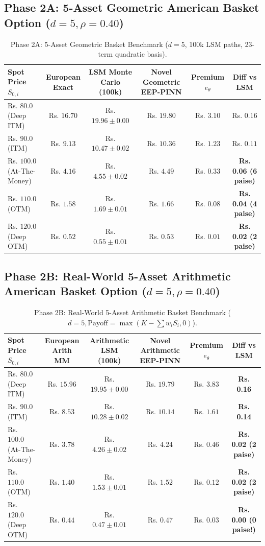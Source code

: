 \documentclass[11pt,a4paper]{article}
\begin{document}
\subsection{Phase 2A: 5-Asset Geometric American Basket Option ($d=5, \rho=0.40$)}
\begin{table}[htbp]
\centering
\small
\caption{Phase 2A: 5-Asset Geometric Basket Benchmark ($d=5$, 100k LSM paths, 23-term quadratic basis).}
\begin{tabularx}{\textwidth}{@{}l c c c c c@{}}
\toprule
\textbf{Spot Price $S_{0,i}$} & \textbf{European Exact} & \textbf{LSM Monte Carlo (100k)} & \textbf{Novel Geometric EEP-PINN} & \textbf{Premium $e_\theta$} & \textbf{Diff vs LSM} \\ \midrule
Rs. $80.0$ (Deep ITM) & Rs. $16.70$ & Rs. $19.96 \pm 0.00$ & Rs. $19.80$ & Rs. $3.10$ & Rs. $0.16$ \\
Rs. $90.0$ (ITM) & Rs. $9.13$ & Rs. $10.47 \pm 0.02$ & Rs. $10.36$ & Rs. $1.23$ & Rs. $0.11$ \\
Rs. $100.0$ (At-The-Money) & Rs. $4.16$ & Rs. $4.55 \pm 0.02$ & Rs. $4.49$ & Rs. $0.33$ & \textbf{Rs. 0.06 (6 paise)} \\
Rs. $110.0$ (OTM) & Rs. $1.58$ & Rs. $1.69 \pm 0.01$ & Rs. $1.66$ & Rs. $0.08$ & \textbf{Rs. 0.04 (4 paise)} \\
Rs. $120.0$ (Deep OTM) & Rs. $0.52$ & Rs. $0.55 \pm 0.01$ & Rs. $0.53$ & Rs. $0.01$ & \textbf{Rs. 0.02 (2 paise)} \\ \bottomrule
\end{tabularx}
\end{table}

\subsection{Phase 2B: Real-World 5-Asset Arithmetic American Basket Option ($d=5, \rho=0.40$)}
\begin{table}[htbp]
\centering
\small
\caption{Phase 2B: Real-World 5-Asset Arithmetic Basket Benchmark ($d=5, \text{Payoff} = \max(K - \sum w_i S_i, 0)$).}
\begin{tabularx}{\textwidth}{@{}l c c c c c@{}}
\toprule
\textbf{Spot Price $S_{0,i}$} & \textbf{European Arith MM} & \textbf{Arithmetic LSM (100k)} & \textbf{Novel Arithmetic EEP-PINN} & \textbf{Premium $e_\theta$} & \textbf{Diff vs LSM} \\ \midrule
Rs. $80.0$ (Deep ITM) & Rs. $15.96$ & Rs. $19.95 \pm 0.00$ & Rs. $19.79$ & Rs. $3.83$ & \textbf{Rs. 0.16} \\
Rs. $90.0$ (ITM) & Rs. $8.53$ & Rs. $10.28 \pm 0.02$ & Rs. $10.14$ & Rs. $1.61$ & \textbf{Rs. 0.14} \\
Rs. $100.0$ (At-The-Money) & Rs. $3.78$ & Rs. $4.26 \pm 0.02$ & Rs. $4.24$ & Rs. $0.46$ & \textbf{Rs. 0.02 (2 paise)} \\
Rs. $110.0$ (OTM) & Rs. $1.40$ & Rs. $1.53 \pm 0.01$ & Rs. $1.52$ & Rs. $0.12$ & \textbf{Rs. 0.02 (2 paise)} \\
Rs. $120.0$ (Deep OTM) & Rs. $0.44$ & Rs. $0.47 \pm 0.01$ & Rs. $0.47$ & Rs. $0.03$ & \textbf{Rs. 0.00 (0 paise!)} \\ \bottomrule
\end{tabularx}
\end{table}
\end{document}
